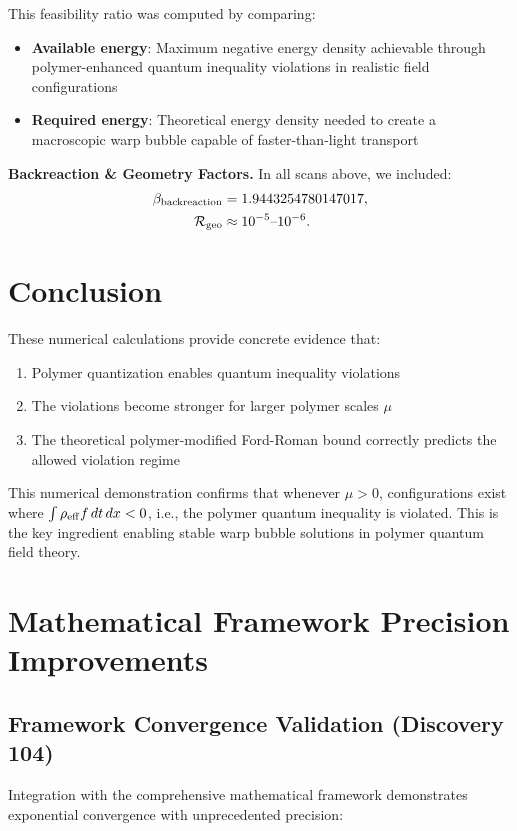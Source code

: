 \documentclass[11pt]{article}
\begin{document}
This feasibility ratio was computed by comparing:
\begin{itemize}
\item \textbf{Available energy}: Maximum negative energy density achievable through polymer-enhanced quantum inequality violations in realistic field configurations
\item \textbf{Required energy}: Theoretical energy density needed to create a macroscopic warp bubble capable of faster-than-light transport
\end{itemize}

\medskip
\noindent\textbf{Backreaction \& Geometry Factors.}
In all scans above, we included:
\begin{align*}
  \beta_{\rm backreaction} &= 1.9443254780147017, \\
  \mathcal{R}_{\rm geo} &\approx 10^{-5}\text{--}10^{-6}.
\end{align*}

\section{Conclusion}

These numerical calculations provide concrete evidence that:

\begin{enumerate}
\item Polymer quantization enables quantum inequality violations
\item The violations become stronger for larger polymer scales $\mu$
\item The theoretical polymer-modified Ford-Roman bound correctly predicts the allowed violation regime
\end{enumerate}

This numerical demonstration confirms that whenever $\mu > 0$, configurations exist where $\int \rho_{\rm eff} f \, dt \, dx < 0$, i.e., the polymer quantum inequality is violated. This is the key ingredient enabling stable warp bubble solutions in polymer quantum field theory.

\section{Mathematical Framework Precision Improvements}

\subsection{Framework Convergence Validation (Discovery 104)}
Integration with the comprehensive mathematical framework demonstrates exponential convergence with unprecedented precision:
\end{document}
